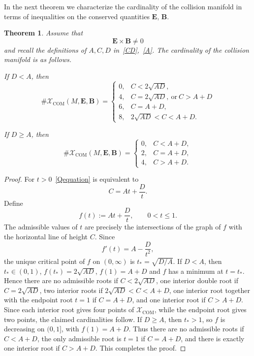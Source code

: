 \documentclass[12pt]{article}
\theoremstyle{plain}
\newtheorem{theorem}{Theorem}[section]
\theoremstyle{definition}
\begin{document}
In the next theorem we characterize the cardinality of the collision manifold in terms of inequalities on the conserved quantities ${\bm E}$, ${\bm B}$. 



\begin{theorem}\label{cardinalitytheorem}
Assume that 
\[
{\bm E}\times{\bm B}\neq0
\]
 and recall the definitions of $A,C,D$ in~\eqref{CD},~\eqref{A}. 
The cardinality of the collision manifold is as follows.

If $D<A$, then
\[
\#\mathcal X_{\mathrm{COM}}(M,{\bm E},{\bm B})
=
\begin{cases}
0, & C<2\sqrt{AD},\\
4, & C=2\sqrt{AD},\ \text{or}\ C>A+D\\
6, & C=A+D,\\
8, & 2\sqrt{AD}<C<A+D.
\end{cases}
\]


If $D\geq A$, then
\[
\#\mathcal X_{\mathrm{COM}}(M,{\bm E},{\bm B})
=
\begin{cases}
0, & C<A+D,\\
2, & C=A+D,\\
4, & C>A+D.
\end{cases}
\]
\end{theorem}

\begin{proof}
For $t>0$~\eqref{Qequation}
is equivalent to
\[
C=At+\frac{D}{t}.
\]
Define
\[
f(t):=At+\frac{D}{t},
\qquad 0<t\le1.
\]
The admissible values of $t$ are precisely the intersections of the graph of $f$ with the horizontal line of height $C$.
Since
\[
f'(t)=A-\frac{D}{t^2},
\]
the unique critical point of $f$ on $(0,\infty)$ is $t_*=\sqrt{D/A}$. 
If $D<A$, then $
t_*\in(0,1)$, $f(t_*)=2\sqrt{AD}$, $f(1)=A+D$
and $f$ has a minimum at $t=t_*$. Hence there are no admissible roots if $C<2\sqrt{AD}$, one interior double root if $C=2\sqrt{AD}$, two interior roots if $2\sqrt{AD}<C<A+D$, one interior root together with the endpoint root $t=1$ if $C=A+D$, and one interior root if $C>A+D$. Since each interior root gives four points of $\mathcal X_{\mathrm{COM}}$, while the endpoint root gives two points, the claimed cardinalities follow.
If $D\geq A$, then $t_*>1$, so $f$ is decreasing on $(0,1]$, with $
f(1)=A+D$.
Thus there are no admissible roots if $C<A+D$, the only admissible root is $t=1$ if $C=A+D$, and there is exactly one interior root if $C>A+D$. This completes the proof.
\end{proof}
\end{document}
